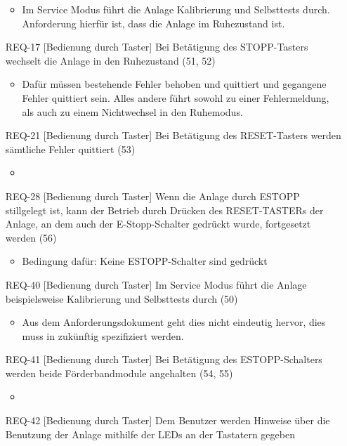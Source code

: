 \begin{itemize}
    \begin{itemize}
        \item Im Service Modus führt die Anlage Kalibrierung und Selbsttests durch. Anforderung hierfür ist, dass die Anlage im Ruhezustand ist.
    \end{itemize}
    \item[REQ-17][Bedienung durch Taster] Bei Betätigung des STOPP-Tasters wechselt die Anlage in den Ruhezustand (51, 52)
    \begin{itemize}
        \item Dafür müssen bestehende Fehler behoben und quittiert und gegangene Fehler quittiert sein. Alles andere führt sowohl zu einer Fehlermeldung, als auch zu einem Nichtwechsel in den Ruhemodus.
    \end{itemize}
    \item[REQ-21][Bedienung durch Taster] Bei Betätigung des RESET-Tasters werden sämtliche Fehler quittiert (53)
    \begin{itemize}
        \item
    \end{itemize}
    \item[REQ-28][Bedienung durch Taster] Wenn die Anlage durch ESTOPP stillgelegt ist, kann der Betrieb durch Drücken des RESET-TASTERs der Anlage, an dem auch der E-Stopp-Schalter gedrückt wurde, fortgesetzt werden (56)
    \begin{itemize}
        \item Bedingung dafür: Keine ESTOPP-Schalter sind gedrückt
    \end{itemize}
    \item[REQ-40][Bedienung durch Taster] Im Service Modus führt die Anlage beispielsweise Kalibrierung und Selbsttests durch (50)
    \begin{itemize}
        \item Aus dem Anforderungsdokument geht dies nicht eindeutig hervor, dies muss in zukünftig spezifiziert werden.
    \end{itemize}
    \item[REQ-41][Bedienung durch Taster] Bei Betätigung des ESTOPP-Schalters werden beide Förderbandmodule angehalten (54, 55)
    \begin{itemize}
        \item
    \end{itemize}
    \item[REQ-42][Bedienung durch Taster] Dem Benutzer werden Hinweise über die Benutzung der Anlage mithilfe der LEDs an der Tastatern gegeben

\end{itemize}
